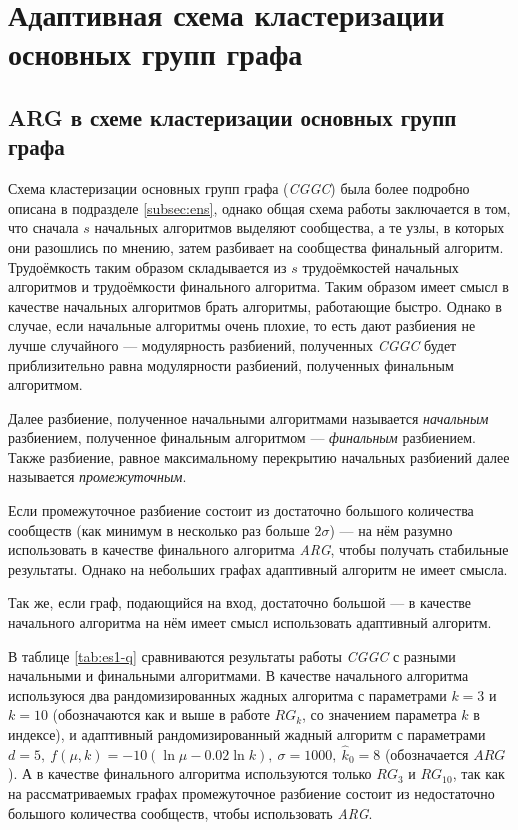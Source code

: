 
\section{Адаптивная схема кластеризации основных групп графа}



\subsection{ARG в схеме кластеризации основных групп графа}

Схема кластеризации основных групп графа (\emph{CGGC}) была более подробно описана в подразделе \ref{subsec:ens}, однако общая схема работы заключается в том, что сначала $s$ начальных алгоритмов выделяют сообщества, а те узлы, в которых они разошлись по мнению, затем разбивает на сообщества финальный алгоритм. Трудоёмкость таким образом складывается из $s$ трудоёмкостей начальных алгоритмов и трудоёмкости финального алгоритма. Таким образом имеет смысл в качестве начальных алгоритмов брать алгоритмы, работающие быстро. Однако в случае, если начальные алгоритмы очень плохие, то есть дают разбиения не лучше случайного --- модулярность разбиений, полученных \emph{CGGC} будет приблизительно равна модулярности разбиений, полученных финальным алгоритмом.

Далее разбиение, полученное начальными алгоритмами называется \emph{начальным} разбиением, полученное финальным алгоритмом --- \emph{финальным} разбиением. Также  разбиение, равное максимальному перекрытию начальных разбиений далее называется \emph{промежуточным}.

Если промежуточное разбиение состоит из достаточно большого количества сообществ (как минимум в несколько раз больше $2\sigma$) --- на нём разумно использовать в качестве финального алгоритма \emph{ARG}, чтобы получать стабильные результаты. Однако на небольших графах адаптивный алгоритм не имеет смысла.

Так же, если граф, подающийся на вход, достаточно большой --- в качестве начального алгоритма на нём имеет смысл использовать адаптивный алгоритм.

В таблице \ref{tab:es1-q} сравниваются результаты работы \emph{CGGC} с разными начальными и финальными алгоритмами. В качестве начального алгоритма используюся два рандомизированных жадных алгоритма с параметрами $k = 3$ и $k = 10$ (обозначаются как и выше в работе $RG_k$, со значением параметра $k$ в индексе), и адаптивный рандомизированный жадный алгоритм с параметрами $d = 5,\ f(\mu, k) = -10(\ln \mu - 0.02 \ln k),\ \sigma = 1000,\ \hat{k}_0 = 8$ (обозначается $ARG$). А в качестве финального алгоритма используются только $RG_3$ и $RG_{10}$, так как на рассматриваемых графах промежуточное разбиение состоит из недостаточно большого количества сообществ, чтобы использовать \emph{ARG}.

